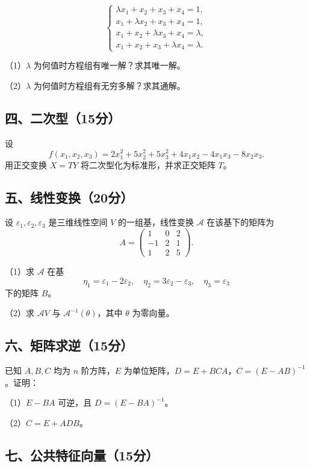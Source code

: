\documentclass[11pt,fontset=fandol]{ctexart}
\begin{document}
\[
\begin{cases}
\lambda x_1+x_2+x_3+x_4=1,\\
x_1+\lambda x_2+x_3+x_4=1,\\
x_1+x_2+\lambda x_3+x_4=\lambda,\\
x_1+x_2+x_3+\lambda x_4=\lambda.
\end{cases}
\]

（1）\(\lambda\) 为何值时方程组有唯一解？求其唯一解。

（2）\(\lambda\) 为何值时方程组有无穷多解？求其通解。

\subsection{四、二次型（15分）}\label{ux56dbux4e8cux6b21ux578b15ux5206}

设 \[
f(x_1,x_2,x_3)=2x_1^2+5x_2^2+5x_3^2+4x_1x_2-4x_1x_3-8x_2x_3.
\] 用正交变换 \(X=TY\) 将二次型化为标准形，并求正交矩阵 \(T\)。

\subsection{五、线性变换（20分）}\label{ux4e94ux7ebfux6027ux53d8ux636220ux5206}

设 \(\varepsilon_1,\varepsilon_2,\varepsilon_3\) 是三维线性空间 \(V\)
的一组基，线性变换 \(\mathcal A\) 在该基下的矩阵为 \[
A=\begin{pmatrix}1&0&2\\-1&2&1\\1&2&5\end{pmatrix}.
\]

（1）求 \(\mathcal A\) 在基 \[
\eta_1=\varepsilon_1-2\varepsilon_2,\quad
\eta_2=3\varepsilon_2-\varepsilon_3,\quad\eta_3=\varepsilon_3
\] 下的矩阵 \(B\)。

（2）求 \(\mathcal AV\) 与 \(\mathcal A^{-1}(\theta)\)，其中 \(\theta\)
为零向量。

\subsection{六、矩阵求逆（15分）}\label{ux516dux77e9ux9635ux6c42ux900615ux5206}

已知 \(A,B,C\) 均为 \(n\) 阶方阵，\(E\)
为单位矩阵，\(D=E+BCA\)，\(C=(E-AB)^{-1}\)。证明：

（1）\(E-BA\) 可逆，且 \(D=(E-BA)^{-1}\)。

（2）\(C=E+ADB\)。

\subsection{七、公共特征向量（15分）}\label{ux4e03ux516cux5171ux7279ux5f81ux5411ux91cf15ux5206}
\end{document}
